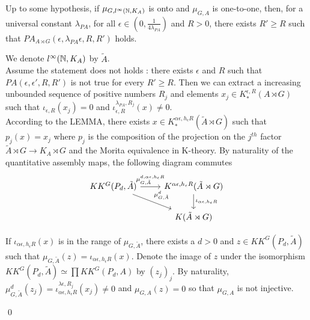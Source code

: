 \begin{thm} 
Up to some hypothesis, if $\mu_{G,l^\infty(\mathbb N, K_A)}$ is onto and $\mu_{G,A}$ is one-to-one, then, for a universal constant $\lambda_{PA}$, for all $\epsilon \in(0,\frac{1}{4\lambda_{PA}})$ and $R>0$, there exists $R'\geq R$ such that $PA_{A\rtimes G}(\epsilon,\lambda_{PA}\epsilon,R,R')$ holds.
\end{thm}

\begin{dem}
We denote $l^\infty(\mathbb N,K_A)$ by $\tilde A$.\\
Assume the statement does not holds : there exists $\epsilon$ and $R$ such that $PA(\epsilon,\epsilon',R,R')$ is not true for every $R'\geq R$. Then we can extract a increasing unbounded sequence of positive numbers $R_j$ and elements $x_j\in K_*^{\epsilon,R}(A\rtimes G)$ such that $\iota_{\epsilon,R}(x_j)=0$ and $\iota_{\epsilon,R}^{\lambda_{PA},R_j}(x)\neq 0$. \\
According to the LEMMA, there exists $x\in K_*^{\alpha\epsilon,h_\epsilon R}(\tilde A\rtimes G)$ such that $p_j(x)=x_j$ where $p_j$ is the composition of the projection on the $j^{th}$ factor $\tilde A \rtimes G \rightarrow K_A \rtimes G$ and the Morita equivalence in K-theory.
By naturality of the quantitative assembly maps, the following diagram commutes
\[\begin{tikzcd}
KK^G(P_d,\tilde A) \arrow{r}{\mu_{G,\tilde A}^{d,\alpha\epsilon, h_\epsilon R}} \arrow{rd}{\mu_{G,\tilde A}^d} & K^{\alpha\epsilon,h_\epsilon R}(\tilde A\rtimes G) \arrow{d}{\iota_{\alpha\epsilon, h_\epsilon R}}\\
                                                      \                          & K(\tilde A\rtimes G)
\end{tikzcd}\]

If $\iota_{\alpha\epsilon,h_\epsilon R}(x)$ is in the range of $\mu_{G,\tilde A}$, there exists a $d>0$ and $z\in KK^G(P_d,\tilde A)$ such that $\mu_{G,\tilde A}(z)=\iota_{\alpha\epsilon,h_\epsilon R}(x)$. Denote the image of $z$ under the isomorphism $KK^G(P_d,\tilde A) \simeq \prod KK^G(P_d,A)$ by $(z_j)_j$. By naturality, $\mu_{G,\tilde A}^d(z_j)=\iota_{\alpha\epsilon,h_\epsilon R}^{\lambda\epsilon,R_j}(x_j)\neq 0$ and $\mu_{G,A}(z)=0$ so that $\mu_{G,A}$ is not injective.

\qed
\end{dem}

